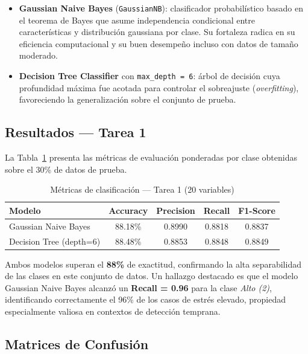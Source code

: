 \documentclass[12pt, letterpaper]{article}
\begin{document}
\begin{itemize}
    \item \textbf{Gaussian Naive Bayes} (\texttt{GaussianNB}): clasificador
          probabilístico basado en el teorema de Bayes que asume independencia
          condicional entre características y distribución gaussiana por
          clase. Su fortaleza radica en su eficiencia computacional y su
          buen desempeño incluso con datos de tamaño moderado.

    \item \textbf{Decision Tree Classifier} con \texttt{max\_depth = 6}:
          árbol de decisión cuya profundidad máxima fue acotada para
          controlar el sobreajuste (\textit{overfitting}), favoreciendo la
          generalización sobre el conjunto de prueba.
\end{itemize}

\subsection{Resultados — Tarea 1}

La Tabla~\ref{tab:tarea1} presenta las métricas de evaluación ponderadas
por clase obtenidas sobre el 30\% de datos de prueba.

\begin{table}[H]
    \centering
    \caption{Métricas de clasificación — Tarea 1 (20 variables)}
    \label{tab:tarea1}
    \begin{tabular}{lcccc}
        \toprule
        \textbf{Modelo} & \textbf{Accuracy} & \textbf{Precision} &
        \textbf{Recall} & \textbf{F1-Score} \\
        \midrule
        \rowcolor{rowgray}
        Gaussian Naive Bayes      & 88.18\% & 0.8990 & 0.8818 & 0.8837 \\
        Decision Tree (depth=6)   & 88.48\% & 0.8853 & 0.8848 & 0.8849 \\
        \bottomrule
    \end{tabular}
\end{table}

Ambos modelos superan el \textbf{88\%} de exactitud, confirmando la alta
separabilidad de las clases en este conjunto de datos. Un hallazgo destacado
es que el modelo Gaussian Naive Bayes alcanzó un \textbf{Recall = 0.96}
para la clase \textit{Alto (2)}, identificando correctamente el 96\% de los
casos de estrés elevado, propiedad especialmente valiosa en contextos de
detección temprana.

\subsection{Matrices de Confusión}
\end{document}

